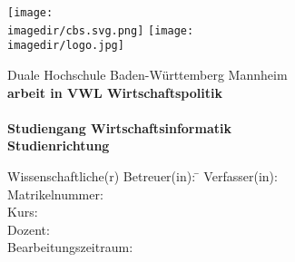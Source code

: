 \begin{titlepage}
\begin{minipage}{\textwidth}
		\vspace{-2cm}
		\vspace{1.5cm}
		\noindent \texttt{[image: \\imagedir/cbs.svg.png]} \hfill \texttt{[image: \\imagedir/logo.jpg]}
\end{minipage}
\vspace{1em}
\begin{center}
	\vspace{2cm}
	{\textsf{\large Duale Hochschule Baden-W\"urttemberg Mannheim}}\\[4em]
	{\textsf{\textbf{\large{\DieArtDerArbeit}arbeit in VWL Wirtschaftspolitik}}}\\[6mm]
	{\textsf{\textbf{\Large{}\DerTitelDerArbeit}}} \\[1.5cm]
	{\textsf{\textbf{\large{}Studiengang Wirtschaftsinformatik}}\\[6mm]
	\textsf{\textbf{Studienrichtung \DieStudienrichtung}}}\vspace{10em}
	

	\vspace{1cm}


	\begin{minipage}{\textwidth}
		\begin{tabbing}
		Wissenschaftliche(r) Betreuer(in): \hspace{0.85cm}\=\kill
		Verfasser(in): \> \DerAutorDerArbeit \\[2.5mm]
		Matrikelnummer: \> \DieMatrikelnummer \\[1.5mm]
		Kurs: \> \DieKursbezeichnung \\[1.5mm]
		Dozent: \> \DerWissBetreuer \\[1.5mm]
		Bearbeitungszeitraum: \> \DerBearbeitungszeitraum\\[1.5mm]
		\end{tabbing}
	\end{minipage}
\end{center}
\end{titlepage}